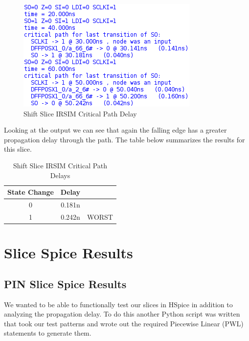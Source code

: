         \begin{figure}[H]
            \centering
            \includegraphics[]{../../irsim/shift_slice_timing.png}
            \caption{Shift Slice IRSIM Critical Path Delay}
        \end{figure}
        \vspace{\baselineskip}

        Looking at the output we can see that again the falling edge has a
        greater propagation delay through the path. The table below summarizes
        the results for this slice.
        \vspace{\baselineskip}

        \begin{table}[H]
            \centering
            \begin{tabular}{crc}
                \toprule
                \textbf{State Change} & \textbf{Delay} & \\
                \midrule
                0 & 0.181n & \\
                1 & 0.242n & WORST \\
                \bottomrule
            \end{tabular}
            \caption{Shift Slice IRSIM Critical Path Delays}
        \end{table}


\newpage
\section{Slice Spice Results}

    \subsection{PIN Slice Spice Results}

        We wanted to be able to functionally test our slices in HSpice in
        addition to analyzing the propagation delay. To do this another Python
        script was written that took our test patterns and wrote out the
        required Piecewise Linear (PWL) statements to generate them.

